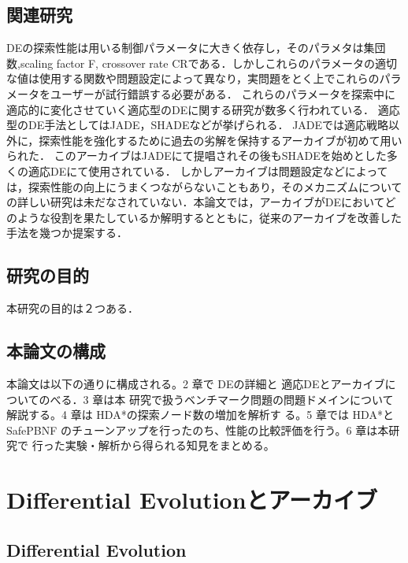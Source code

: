 \documentclass[a4paper,11pt,oneside,openany]{jsbook}
\begin{document}
\section{関連研究}
DEの探索性能は用いる制御パラメータに大きく依存し，そのパラメタは集団数,scaling factor F, crossover rate CRである．しかしこれらのパラメータの適切な値は使用する関数や問題設定によって異なり，実問題をとく上でこれらのパラメータをユーザーが試行錯誤する必要がある．
これらのパラメータを探索中に適応的に変化させていく適応型のDEに関する研究が数多く行われている．
適応型のDE手法としてはJADE\cite{JADE}，SHADE\cite{SHADE}などが挙げられる．
JADEでは適応戦略以外に，探索性能を強化するために過去の劣解を保持するアーカイブが初めて用いられた．
このアーカイブはJADEにて提唱されその後もSHADEを始めとした多くの適応DEにて使用されている．
しかしアーカイブは問題設定などによっては，探索性能の向上にうまくつながらないこともあり，そのメカニズムについての詳しい研究は未だなされていない．本論文では，アーカイブがDEにおいてどのような役割を果たしているか解明するとともに，従来のアーカイブを改善した手法を幾つか提案する．

\section{研究の目的}
本研究の目的は２つある．

\section{本論文の構成}
本論文は以下の通りに構成される。2 章で DEの詳細と 適応DEとアーカイブについてのべる．3 章は本
研究で扱うベンチマーク問題の問題ドメインについて解説する。4 章は HDA*の探索ノード数の増加を解析す
る。5 章では HDA*と SafePBNF のチューンアップを行ったのち、性能の比較評価を行う。6 章は本研究で
行った実験・解析から得られる知見をまとめる。


\chapter{Differential Evolutionとアーカイブ}
\section{Differential Evolution}
\end{document}
